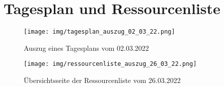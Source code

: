 \section*{Tagesplan und Ressourcenliste}
\begin{figure}[H]
    \texttt{[image: img/tagesplan\_auszug\_02\_03\_22.png]}
    \caption{Auszug eines Tagesplans vom 02.03.2022}\label{fig:tagesplan}
\end{figure}

\begin{figure}[H]
    \texttt{[image: img/ressourcenliste\_auszug\_26\_03\_22.png]}
    \caption{Übersichtsseite der Ressourcenliste vom 26.03.2022}\label{fig:ressourcenliste}
\end{figure}